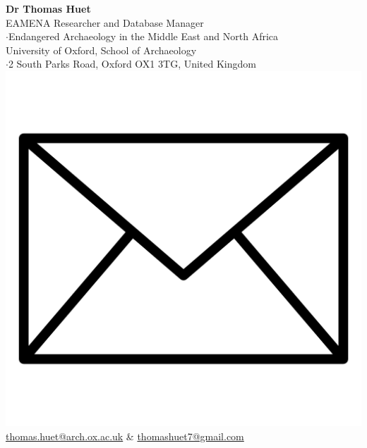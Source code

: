 \documentclass{article}
\begin{document}
\large{\textbf{Dr Thomas Huet}}\\
\normalsize
EAMENA Researcher and Database Manager\\
\small
$\cdot$Endangered Archaeology in the Middle East and North Africa\\
\normalsize
University of Oxford, School of Archaeology\\
\small
$\cdot$2 South Parks Road, Oxford OX1 3TG, United Kingdom
\normalsize
\\
\includegraphics[scale=0.025]{gmail} \quad \href{mailto:thomas.huet@arch.ox.ac.uk}{thomas.huet@arch.ox.ac.uk} \& \href{mailto:thomashuet7@gmail.com}{thomashuet7@gmail.com}\\
\end{document}
